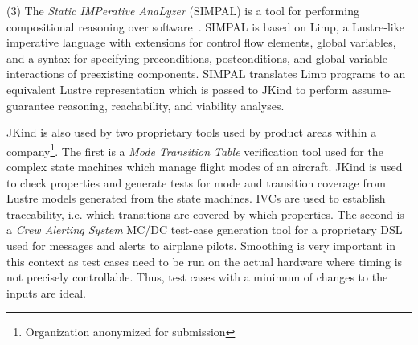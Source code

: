 \documentclass{llncs}
\newcommand{\jkind}{{\sc JKind}\xspace}
\newcommand{\lustre}{{\sc Lustre}\xspace}
\newcommand{\simpal}{{\sc SIMPAL}\xspace}
\newcommand{\limp}{{\sc Limp}\xspace}
\renewcommand{\paragraph}[1]{\vspace{5pt}\noindent {\bf #1}}
\newcommand{\application}[2]{
  \paragraph{#1} \hfill {\it #2}
  \vspace{1pt}
}
\begin{document}
(3) The {\em Static IMPerative AnaLyzer} (\simpal) is a tool for
performing compositional reasoning over
software~\cite{wagner2017spin}. \simpal is based on \limp, a \lustre-like imperative language with extensions for control flow elements, global variables, and a syntax for specifying preconditions, postconditions, and global variable interactions of
preexisting components. \simpal translates \limp programs to an
equivalent \lustre representation which is passed to \jkind to
perform assume-guarantee reasoning, reachability, and viability
analyses. 

\jkind is also used by two proprietary tools used by product areas within a company\footnote{Organization anonymized for submission}.  The first is a {\em Mode Transition Table} verification tool used for the complex state machines which manage flight modes of an aircraft.
\jkind is used to check properties and generate tests for mode and transition coverage from \lustre models generated from the state machines.
IVCs are used to establish traceability, i.e. which transitions are covered by which properties.  The second is a {\em Crew Alerting System} MC/DC test-case generation tool for a proprietary DSL used for messages and alerts to airplane pilots.  Smoothing is very important in this context as test cases need to be run on the actual hardware where
timing is not precisely controllable. Thus, test cases with a minimum
of changes to the inputs are ideal.
%
%


\end{document}
